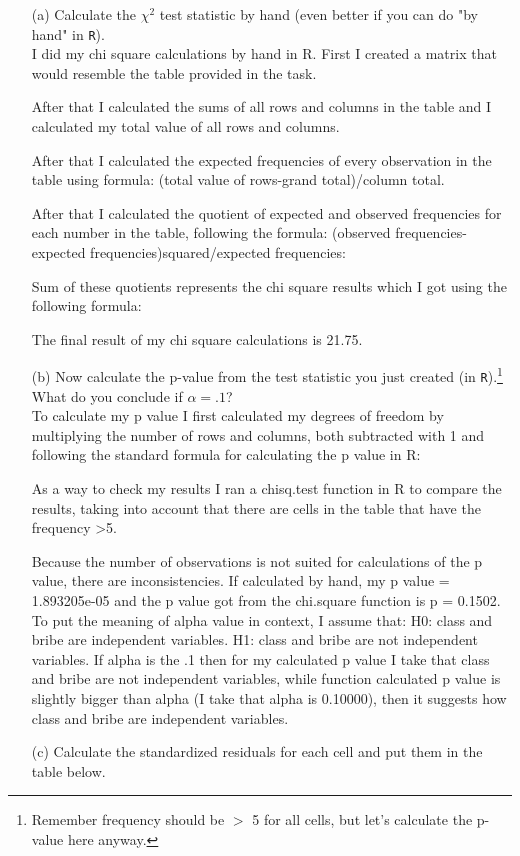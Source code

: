\documentclass[12pt,letterpaper]{article}
\begin{document}
\begin{enumerate}
	
	\item [(a)]
	Calculate the $\chi^2$ test statistic by hand (even better if you can do "by hand" in \texttt{R}).\\
	\vspace{0.5cm}
	I did my chi square calculations by hand in R. First I created a matrix that would resemble the table provided in the task. 
	
	After that I calculated the sums of all rows and columns in the table and I calculated my total value of all rows and columns.
	 
	After that I calculated the expected frequencies of every observation in the table using formula: (total value of rows-grand total)/column total. 
	 
	After that I calculated the quotient of expected and observed frequencies for each number in the table, following the formula: (observed frequencies-expected frequencies)squared/expected frequencies:
	
	Sum of these quotients represents the chi square results which I got using the following formula:
	 
	The final result of my chi square calculations is 21.75.
	
	\item [(b)]
	Now calculate the p-value from the test statistic you just created (in \texttt{R}).\footnote{Remember frequency should be $>$ 5 for all cells, but let's calculate the p-value here anyway.}  What do you conclude if $\alpha = .1$?\\
	To calculate my p value I first calculated my degrees of freedom by multiplying the number of rows and columns, both subtracted with 1 and following the standard formula for calculating the p value in R:
	  
	As a way to check my results I ran a chisq.test function in R to compare the results, taking into account that there are cells in the table that have the frequency >5. 
	
	Because the number of observations is not suited for calculations of the p value, there are inconsistencies. If calculated by hand, my p value = 1.893205e-05 and the p value got from the chi.square function is p = 0.1502. 
	To put the meaning of alpha value in context, I assume that:
	H0: class and bribe are independent variables.
	H1: class and bribe are not independent variables. 
	If alpha is the .1 then for my calculated p value I take that class and bribe are not independent variables, while function calculated p value is slightly bigger than alpha (I take that alpha is 0.10000), then it suggests how class and bribe are independent variables. 
	\vspace{1cm} 
	\item [(c)] Calculate the standardized residuals for each cell and put them in the table below.
	\vspace{1cm}
	

\end{enumerate}
\end{document}
